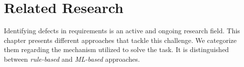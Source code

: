 \chapter{Related Research}
\label{chp:related_research}
Identifying defects in requirements is an active and ongoing research field.
This chapter presents different approaches that tackle this challenge.
We categorize them regarding the mechanism utilized to solve the task.
It is distinguished between \textit{rule-based} and \textit{\ac{ML}-based} approaches.



